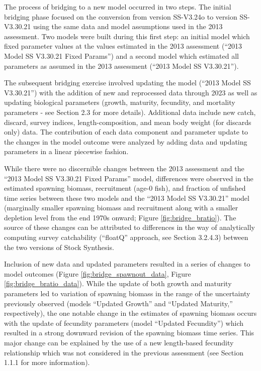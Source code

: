 \documentclass[11pt,
  english,
  letterpaper,
]{article}
\begin{document}
The process of bridging to a new model occurred in two steps. The initial bridging phase focused on the conversion from version SS-V3.24o to version SS-V3.30.21 using the same data and model assumptions used in the 2013 assessment. Two models were built during this first step: an initial model which fixed parameter values at the values estimated in the 2013 assessment (``2013 Model SS V3.30.21 Fixed Params'') and a second model which estimated all parameters as assumed in the 2013 assessment (``2013 Model SS V3.30.21'').

The subsequent bridging exercise involved updating the model (``2013 Model SS V3.30.21'') with the addition of new and reprocessed data through 2023 as well as updating biological parameters (growth, maturity, fecundity, and mortality parameters - see Section 2.3 for more details). Additional data include new catch, discard, survey indices, length-composition, and mean body weight (for discards only) data. The contribution of each data component and parameter update to the changes in the model outcome were analyzed by adding data and updating parameters in a linear piecewise fashion.

While there were no discernible changes between the 2013 assessment and the ``2013 Model SS V3.30.21 Fixed Params'' model, differences were observed in the estimated spawning biomass, recruitment (age-0 fish), and fraction of unfished time series between these two models and the ``2013 Model SS V3.30.21'' model (marginally smaller spawning biomass and recruitment along with a smaller depletion level from the end 1970s onward; Figure \ref{fig:bridge_bratio}). The source of these changes can be attributed to differences in the way of analytically computing survey catchability (``floatQ'' approach, see Section 3.2.4.3) between the two versions of Stock Synthesis.

Inclusion of new data and updated parameters resulted in a series of changes to model outcomes (Figure \ref{fig:bridge_spawnout_data}, Figure \ref{fig:bridge_bratio_data}). While the update of both growth and maturity parameters led to variation of spawning biomass in the range of the uncertainty previously observed (models ``Updated Growth'' and ``Updated Maturity,'' respectively), the one notable change in the estimates of spawning biomass occurs with the update of fecundity parameters (model ``Updated Fecundity'') which resulted in a strong downward revision of the spawning biomass time series. This major change can be explained by the use of a new length-based fecundity relationship which was not considered in the previous assessment (see Section 1.1.1 for more information).
\end{document}
